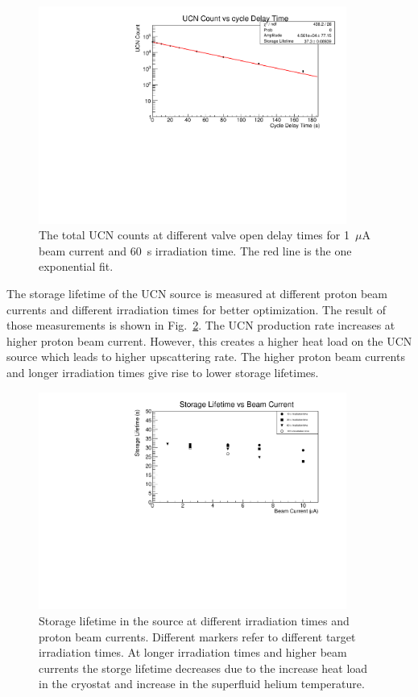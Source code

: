 \begin{figure}[h]
  \centering
  \includegraphics[width=0.9\textwidth]{17002_StorageLifetime.pdf}
  \caption{The total UCN counts at different valve open delay times
    for 1~$\mu$A beam current and 60~s irradiation time. The red line
    is the one exponential fit. }
  \label{fig:storage_example}
\end{figure}


The storage lifetime of the UCN source is measured at different proton
beam currents and different irradiation times for better
optimization. The result of those measurements is shown in
Fig.~\ref{fig:storage_beam_irrad}. The UCN production rate increases at higher
proton beam current. However, this creates a higher heat load on the
UCN source which leads to higher upscattering rate. The higher
proton beam currents and longer irradiation times give rise to lower
storage lifetimes.

\begin{figure}[h]
  \centering
  \includegraphics[width=0.9\textwidth]{StorageLifetime_17009_and_17009A.pdf}
  \caption{Storage lifetime in the source at different irradiation
    times and proton beam currents. Different markers refer to
    different target irradiation times. At longer irradiation times
    and higher beam currents the storge lifetime decreases due to the
    increase heat load in the cryostat and increase in the superfluid
    helium temperature. }
  \label{fig:storage_beam_irrad}
\end{figure}

